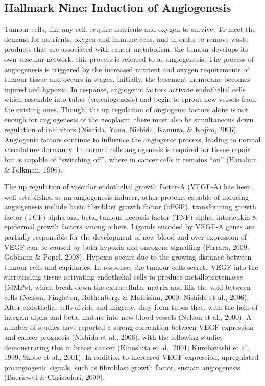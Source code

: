 \documentclass[a4paper, twoside]{templates/ociamthesis}
\begin{document}
\hypertarget{hallmark-nine-induction-of-angiogenesis}{%
\subsection{Hallmark Nine: Induction of Angiogenesis}\label{hallmark-nine-induction-of-angiogenesis}}

Tumour cells, like any cell, require nutrients and oxygen to survive. To meet the demand for nutrients, oxygen and immune cells, and in order to remove waste products that are associated with cancer metabolism, the tumour develops its own vascular network, this process is referred to as angiogenesis. The process of angiogenesis is triggered by the increased nutrient and oxygen requirements of tumour tissue and occurs in stages. Initially, the basement membrane becomes injured and hypoxic. In response, angiogenic factors activate endothelial cells which assemble into tubes (vasculogenesis) and begin to sprout new vessels from the existing ones. Though, the up regulation of angiogenic factors alone is not enough for angiogenesis of the neoplasm, there must also be simultaneous down regulation of inhibitors (Nishida, Yano, Nishida, Kamura, \& Kojiro, 2006). Angiogenic factors continue to influence the angiogenic process, leading to normal vasculature dormancy. In normal cells angiogenesis is required for tissue repair but is capable of ``switching off'', where in cancer cells it remains ``on'' (Hanahan \& Folkman, 1996).

The up regulation of vascular endothelial growth factor-A (VEGF-A) has been well-established as an angiogenesis inducer, other proteins capable of inducing angiogenesis include basic fibroblast growth factor (bFGF), transforming growth factor (TGF) alpha and beta, tumour necrosis factor (TNF)-alpha, interleukin-8, epidermal growth factors among others. Ligands encoded by VEGF-A genes are partially responsible for the development of new blood and over expression of VEGF can be caused by both hypoxia and oncogene signalling (Ferrara, 2009; Gabhann \& Popel, 2008). Hypoxia occurs due to the growing distance between tumour cells and capillaries. In response, the tumour cells secrete VEGF into the surrounding tissue activating endothelial cells to produce metalloproteinases (MMPs), which break down the extracellular matrix and fills the void between cells (Nelson, Fingleton, Rothenberg, \& Matrisian, 2000; Nishida et al., 2006). After endothelial cells divide and migrate, they form tubes that, with the help of integrin alpha and beta, mature into new blood vessels (Nelson et al., 2000). A number of studies have reported a strong correlation between VEGF expression and cancer prognosis (Nishida et al., 2006), with the following studies demonstrating this in breast cancer (Kinoshita et al., 2001; Kurebayashi et al., 1999; Skobe et al., 2001). In addition to increased VEGF expression, upregulated proangiogenic signals, such as fibroblast growth factor, sustain angiogenesis (Baeriswyl \& Christofori, 2009).
\end{document}
